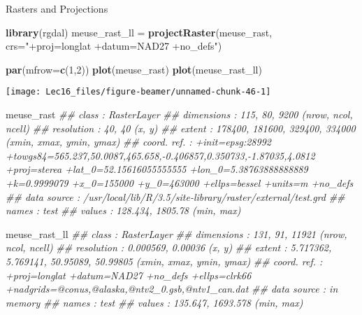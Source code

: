 \documentclass[11pt,ignorenonframetext,]{beamer}
\newenvironment{Shaded}{}{}
\newcommand{\CommentTok}[1]{\textcolor[rgb]{0.38,0.63,0.69}{\textit{#1}}}
\newcommand{\DataTypeTok}[1]{\textcolor[rgb]{0.56,0.13,0.00}{#1}}
\newcommand{\DecValTok}[1]{\textcolor[rgb]{0.25,0.63,0.44}{#1}}
\newcommand{\KeywordTok}[1]{\textcolor[rgb]{0.00,0.44,0.13}{\textbf{#1}}}
\newcommand{\NormalTok}[1]{#1}
\newcommand{\StringTok}[1]{\textcolor[rgb]{0.25,0.44,0.63}{#1}}
\let\oldShaded\Shaded
\let\endoldShaded\endShaded
\renewenvironment{Shaded}{\footnotesize\begin{spacing}{0.9}\oldShaded}{\endoldShaded\end{spacing}}
\let\oldverbatim\verbatim
\let\endoldverbatim\endverbatim
\newcommand{\scriptoutput}{
  \renewenvironment{Shaded}{\scriptsize\begin{spacing}{0.9}\oldShaded}{\endoldShaded\end{spacing}}
  \renewenvironment{verbatim}{\scriptsize\begin{spacing}{0.9}\oldverbatim}{\endoldverbatim\end{spacing}}
}
\begin{document}
\begin{frame}[fragile,t]{Rasters and Projections}
\protect\hypertarget{rasters-and-projections}{}

\scriptoutput

\begin{Shaded}
\begin{Highlighting}[]
\KeywordTok{library}\NormalTok{(rgdal)}
\NormalTok{meuse_rast_ll =}\StringTok{ }\KeywordTok{projectRaster}\NormalTok{(meuse_rast, }\DataTypeTok{crs=}\StringTok{"+proj=longlat +datum=NAD27 +no_defs"}\NormalTok{)}

\KeywordTok{par}\NormalTok{(}\DataTypeTok{mfrow=}\KeywordTok{c}\NormalTok{(}\DecValTok{1}\NormalTok{,}\DecValTok{2}\NormalTok{))}
\KeywordTok{plot}\NormalTok{(meuse_rast)}
\KeywordTok{plot}\NormalTok{(meuse_rast_ll)}
\end{Highlighting}
\end{Shaded}

\begin{center}\texttt{[image: Lec16\_files/figure-beamer/unnamed-chunk-46-1]} \end{center}

\end{frame}

\begin{frame}[fragile,t]{}
\protect\hypertarget{section-8}{}

\scriptsize

\begin{Shaded}
\begin{Highlighting}[]
\NormalTok{meuse_rast}
\CommentTok{## class       : RasterLayer }
\CommentTok{## dimensions  : 115, 80, 9200  (nrow, ncol, ncell)}
\CommentTok{## resolution  : 40, 40  (x, y)}
\CommentTok{## extent      : 178400, 181600, 329400, 334000  (xmin, xmax, ymin, ymax)}
\CommentTok{## coord. ref. : +init=epsg:28992 +towgs84=565.237,50.0087,465.658,-0.406857,0.350733,-1.87035,4.0812 +proj=sterea +lat_0=52.15616055555555 +lon_0=5.38763888888889 +k=0.9999079 +x_0=155000 +y_0=463000 +ellps=bessel +units=m +no_defs }
\CommentTok{## data source : /usr/local/lib/R/3.5/site-library/raster/external/test.grd }
\CommentTok{## names       : test }
\CommentTok{## values      : 128.434, 1805.78  (min, max)}

\NormalTok{meuse_rast_ll}
\CommentTok{## class       : RasterLayer }
\CommentTok{## dimensions  : 131, 91, 11921  (nrow, ncol, ncell)}
\CommentTok{## resolution  : 0.000569, 0.00036  (x, y)}
\CommentTok{## extent      : 5.717362, 5.769141, 50.95089, 50.99805  (xmin, xmax, ymin, ymax)}
\CommentTok{## coord. ref. : +proj=longlat +datum=NAD27 +no_defs +ellps=clrk66 +nadgrids=@conus,@alaska,@ntv2_0.gsb,@ntv1_can.dat }
\CommentTok{## data source : in memory}
\CommentTok{## names       : test }
\CommentTok{## values      : 135.647, 1693.578  (min, max)}
\end{Highlighting}
\end{Shaded}

\end{frame}
\end{document}
